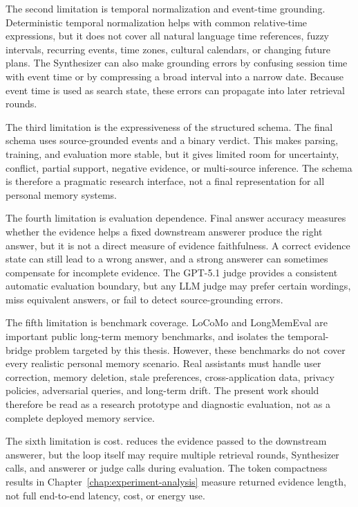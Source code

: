 The second limitation is temporal normalization and event-time grounding.
Deterministic temporal normalization helps with common relative-time
expressions, but it does not cover all natural language time references, fuzzy
intervals, recurring events, time zones, cultural calendars, or changing future
plans. The Synthesizer can also make grounding errors by confusing session time
with event time or by compressing a broad interval into a narrow date. Because
event time is used as search state, these errors can propagate into later
retrieval rounds.

The third limitation is the expressiveness of the structured schema. The final
schema uses source-grounded events and a binary verdict. This makes parsing,
training, and evaluation more stable, but it gives limited room for
uncertainty, conflict, partial support, negative evidence, or multi-source
inference. The schema is therefore a pragmatic research interface, not a final
representation for all personal memory systems.

The fourth limitation is evaluation dependence. Final answer accuracy measures
whether the evidence helps a fixed downstream answerer produce the right
answer, but it is not a direct measure of evidence faithfulness. A correct
evidence state can still lead to a wrong answer, and a strong answerer can
sometimes compensate for incomplete evidence. The GPT-5.1 judge provides a
consistent automatic evaluation boundary, but any LLM judge may prefer certain
wordings, miss equivalent answers, or fail to detect source-grounding errors.

The fifth limitation is benchmark coverage. LoCoMo and LongMemEval are
important public long-term memory benchmarks, and \bench{} isolates the
temporal-bridge problem targeted by this thesis. However, these benchmarks do
not cover every realistic personal memory scenario. Real assistants must handle
user correction, memory deletion, stale preferences, cross-application data,
privacy policies, adversarial queries, and long-term drift. The present work
should therefore be read as a research prototype and diagnostic evaluation, not
as a complete deployed memory service.

The sixth limitation is cost. \sys{} reduces the evidence passed to the
downstream answerer, but the loop itself may require multiple retrieval rounds,
Synthesizer calls, and answerer or judge calls during evaluation. The token
compactness results in Chapter~\ref{chap:experiment-analysis} measure returned
evidence length, not full end-to-end latency, cost, or energy use.


